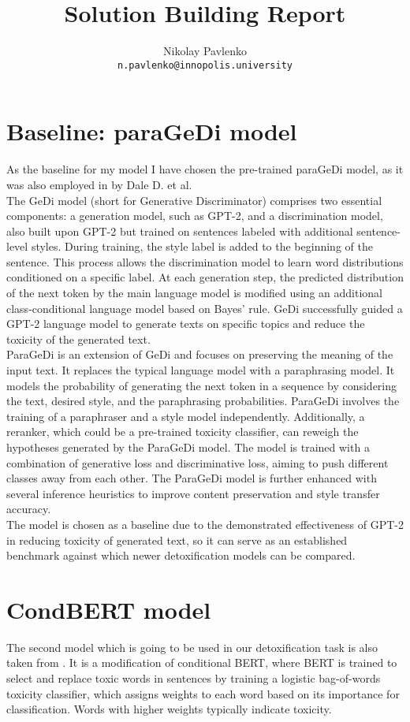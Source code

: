 \documentclass[]{article}
\title{Solution Building Report}
\author{
	Nikolay Pavlenko\\
	\texttt{n.pavlenko@innopolis.university}
}
\begin{document}
	\maketitle
	\section{Baseline: paraGeDi model}
	As the baseline for my model I have chosen the pre-trained paraGeDi model, as it was also employed in \cite{main} by Dale D. et al. \\
	
	The GeDi model (short for Generative Discriminator) comprises two essential components: a generation model, such as GPT-2, and a discrimination model, also built upon GPT-2 but trained on sentences labeled with additional sentence-level styles. During training, the style label is added to the beginning of the sentence. This process allows the discrimination model to learn word distributions conditioned on a specific label. At each generation step, the predicted distribution of the next token by the main language model is modified using an additional class-conditional language model based on Bayes' rule. GeDi successfully guided a GPT-2 language model to generate texts on specific topics and reduce the toxicity of the generated text. \\
	
	ParaGeDi is an extension of GeDi and focuses on preserving the meaning of the input text. It replaces the typical language model with a paraphrasing model. It models the probability of generating the next token in a sequence by considering the text, desired style, and the paraphrasing probabilities. ParaGeDi involves the training of a paraphraser and a style model independently. Additionally, a reranker, which could be a pre-trained toxicity classifier, can reweigh the hypotheses generated by the ParaGeDi model. The model is trained with a combination of generative loss and discriminative loss, aiming to push different classes away from each other. The ParaGeDi model is further enhanced with several inference heuristics to improve content preservation and style transfer accuracy. \\
	
	The model is chosen as a baseline due to the demonstrated effectiveness of GPT-2 in reducing toxicity of generated text, so it can serve as an established benchmark against which newer detoxification models can be compared.
	\\
	\section{CondBERT model}
	The second model which is going to be used in our detoxification task is also taken from \cite{main}. It is a modification of conditional BERT, where BERT is trained to select and replace toxic words in sentences by training a logistic bag-of-words toxicity classifier, which assigns weights to each word based on its importance for classification. Words with higher weights typically indicate toxicity. 
	
\end{document}
